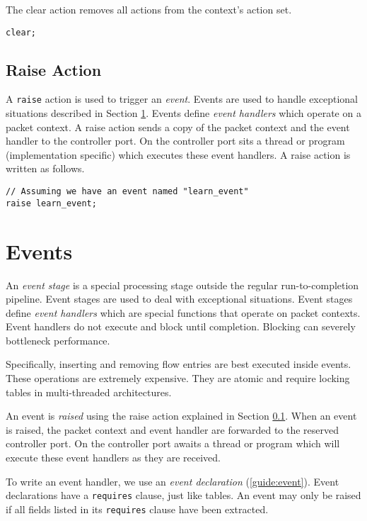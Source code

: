 The clear action removes all actions from the context's action set.

\begin{lstlisting}
clear;
\end{lstlisting}

\subsection{Raise Action} \label{tut:raise_action}

A \texttt{raise} action is used to trigger an \textit{event}. Events are used to
handle exceptional situations described in Section \ref{tut:event}. Events
define \textit{event handlers} which operate on a packet context. A raise action
sends a copy of the packet context and the event handler to the controller port.
On the controller port sits a thread or program (implementation specific) which
executes these event handlers. A raise action is written as follows.

\begin{lstlisting}
// Assuming we have an event named "learn_event"
raise learn_event;
\end{lstlisting}

\section{Events} \label{tut:event}

An \textit{event stage} is a special processing stage outside the regular
run-to-completion pipeline. Event stages are used to deal with exceptional
situations. Event stages define \textit{event handlers} which are special
functions that operate on packet contexts. Event handlers do not execute and
block until completion. Blocking can severely bottleneck performance.

Specifically, inserting and removing flow entries are best executed inside
events. These operations are extremely expensive. They are atomic and require
locking tables in multi-threaded architectures.

An event is \textit{raised} using the raise action explained in Section
\ref{tut:raise_action}. When an event is raised, the packet context and event
handler are forwarded to the reserved controller port. On the controller port
awaits a thread or program which will execute these event handlers as they are
received.

To write an event handler, we use an \textit{event declaration}
(\ref{guide:event}). Event declarations have a \texttt{requires} clause, just
like tables. An event may only be raised if all fields listed in its
\texttt{requires} clause have been extracted.

